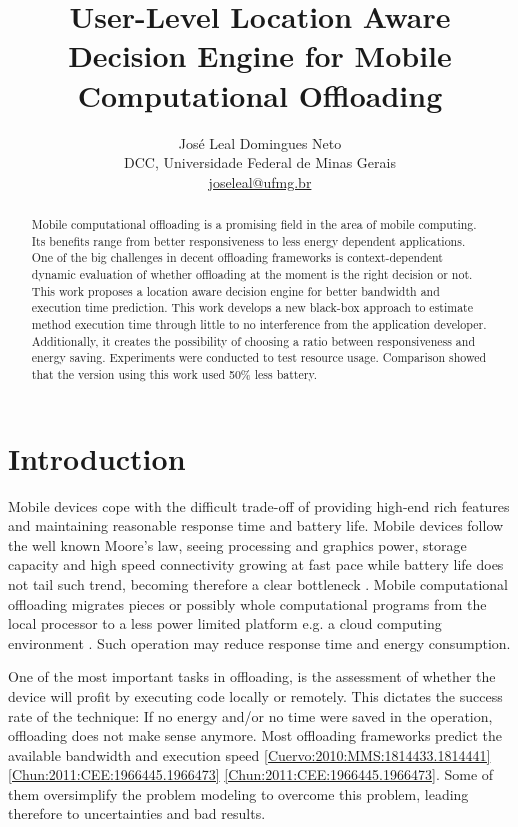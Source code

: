 \documentclass[10pt, conference, letterpaper]{IEEEtran}
\title{User-Level Location Aware Decision Engine for Mobile Computational Offloading}
\author{José Leal Domingues Neto \\ DCC, Universidade Federal de Minas Gerais \\ \href{mailto:joseleal@ufmg.br}{joseleal@ufmg.br}}
\begin{document}
\maketitle

\begin{abstract}
  Mobile computational offloading is a promising field in the area of mobile computing. Its benefits range from better responsiveness to less energy dependent applications. One of the big challenges in decent offloading frameworks is context-dependent dynamic evaluation of whether offloading at the moment is the right decision or not. This work proposes a location aware decision engine for better bandwidth and execution time prediction. This work develops a new black-box approach to estimate method execution time through little to no interference from the application developer. Additionally, it creates the possibility of choosing a ratio between responsiveness and energy saving. Experiments were conducted to test resource usage. Comparison showed that the version using this work used 50\% less battery.
\end{abstract}

\section{Introduction}
  Mobile devices cope with the difficult trade-off of providing high-end rich features and maintaining reasonable response time and battery life. Mobile devices follow the well known Moore's law, seeing processing and graphics power, storage capacity and high speed connectivity growing at fast pace while battery life does not tail such trend, becoming therefore a clear bottleneck \cite{Cuervo:2010:MMS:1814433.1814441}. Mobile computational offloading migrates pieces or possibly whole computational programs from the local processor to a less power limited platform e.g. a cloud computing environment \cite{Scavenger:5466972}. Such operation may reduce response time and energy consumption.  

  One of the most important tasks in offloading, is the assessment of whether the device will profit by executing code locally or remotely. This dictates the success rate of the technique: If no energy and/or no time were saved in the operation, offloading does not make sense anymore. Most offloading frameworks predict the available bandwidth and execution speed \ref{Cuervo:2010:MMS:1814433.1814441} \ref{Chun:2011:CEE:1966445.1966473} \ref{Chun:2011:CEE:1966445.1966473}. Some of them oversimplify the problem modeling to overcome this problem, leading therefore to uncertainties and bad results.
  
\end{document}

